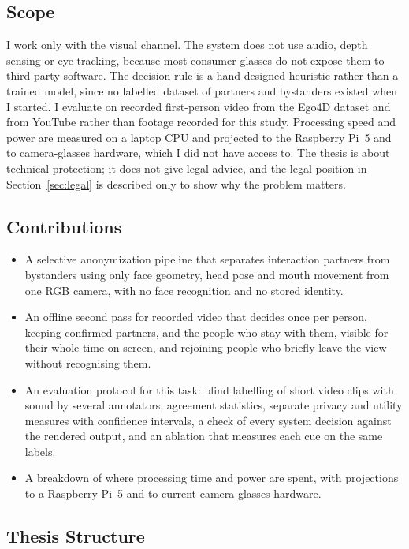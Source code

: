 \subsection{Scope}

I work only with the visual channel. The system does not use audio, depth sensing or eye
tracking, because most consumer glasses do not expose them to third-party software. The
decision rule is a hand-designed heuristic rather than a trained model, since no labelled
dataset of partners and bystanders existed when I started. I evaluate on recorded
first-person video from the Ego4D dataset and from YouTube rather than footage recorded
for this study. Processing speed and power are measured on a laptop CPU and projected to
the Raspberry Pi~5 and to camera-glasses hardware, which I did not have access to. The
thesis is about technical protection; it does not give legal advice, and the legal
position in Section~\ref{sec:legal} is described only to show why the problem matters.

\subsection{Contributions}

\begin{itemize}
  \item A selective anonymization pipeline that separates interaction partners from
        bystanders using only face geometry, head pose and mouth movement from one RGB
        camera, with no face recognition and no stored identity.
  \item An offline second pass for recorded video that decides once per person, keeping
        confirmed partners, and the people who stay with them, visible for their whole time
        on screen, and rejoining people who briefly leave the view without recognising them.
  \item An evaluation protocol for this task: blind labelling of short video clips with
        sound by several annotators, agreement statistics, separate privacy and utility
        measures with confidence intervals, a check of every system decision against the
        rendered output, and an ablation that measures each cue on the same labels.
  \item A breakdown of where processing time and power are spent, with projections to a
        Raspberry Pi~5 and to current camera-glasses hardware.
\end{itemize}

\subsection{Thesis Structure}

